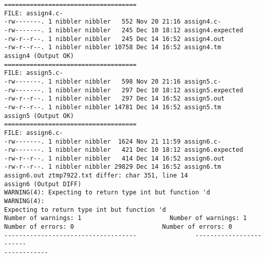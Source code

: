 \documentclass[12pt]{book}
\begin{document}
\begin{lstlisting}
====================================
FILE: assign4.c-
-rw-------. 1 nibbler nibbler   552 Nov 20 21:16 assign4.c-
-rw-------. 1 nibbler nibbler   245 Dec 10 18:12 assign4.expected
-rw-r--r--. 1 nibbler nibbler   245 Dec 14 16:52 assign4.out
-rw-r--r--. 1 nibbler nibbler 10758 Dec 14 16:52 assign4.tm
assign4 (Output OK)
====================================
FILE: assign5.c-
-rw-------. 1 nibbler nibbler   598 Nov 20 21:16 assign5.c-
-rw-------. 1 nibbler nibbler   297 Dec 10 18:12 assign5.expected
-rw-r--r--. 1 nibbler nibbler   297 Dec 14 16:52 assign5.out
-rw-r--r--. 1 nibbler nibbler 14781 Dec 14 16:52 assign5.tm
assign5 (Output OK)
====================================
FILE: assign6.c-
-rw-------. 1 nibbler nibbler  1624 Nov 21 11:59 assign6.c-
-rw-------. 1 nibbler nibbler   421 Dec 10 18:12 assign6.expected
-rw-r--r--. 1 nibbler nibbler   414 Dec 14 16:52 assign6.out
-rw-r--r--. 1 nibbler nibbler 29829 Dec 14 16:52 assign6.tm
assign6.out ztmp7922.txt differ: char 351, line 14
assign6 (Output DIFF)
WARNING(4): Expecting to return type int but function 'd    WARNING(4): 
Expecting to return type int but function 'd
Number of warnings: 1                        Number of warnings: 1
Number of errors: 0                        Number of errors: 0
------------------------------------                ------------------------
------------


\end{lstlisting}
\end{document}
